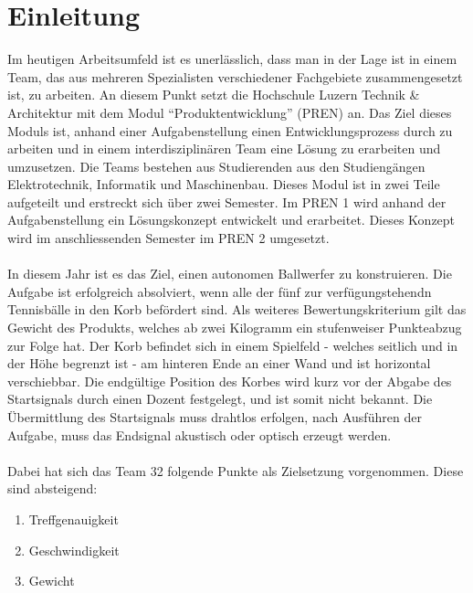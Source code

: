 ﻿\section{Einleitung}
Im heutigen Arbeitsumfeld ist es unerlässlich, dass man in der Lage ist in einem Team, das aus mehreren Spezialisten verschiedener Fachgebiete zusammengesetzt ist, zu arbeiten. An diesem Punkt setzt die Hochschule Luzern Technik \& Architektur mit dem Modul \enquote{Produktentwicklung} (PREN) an. Das Ziel dieses Moduls ist, anhand einer Aufgabenstellung einen Entwicklungsprozess durch zu arbeiten und in einem interdisziplinären Team eine Lösung zu erarbeiten und umzusetzen. Die Teams bestehen aus Studierenden aus den Studiengängen Elektrotechnik, Informatik und Maschinenbau. Dieses Modul ist in zwei Teile aufgeteilt und erstreckt sich über zwei Semester. Im PREN 1 wird anhand der Aufgabenstellung ein Lösungskonzept entwickelt und erarbeitet. Dieses Konzept wird im anschliessenden Semester im PREN 2 umgesetzt.\\
\\
In diesem Jahr ist es das Ziel, einen autonomen Ballwerfer zu konstruieren. Die Aufgabe ist erfolgreich absolviert, wenn alle der fünf zur verfügungstehendn Tennisbälle in den Korb befördert sind. Als weiteres Bewertungskriterium gilt das Gewicht des Produkts, welches ab zwei Kilogramm ein stufenweiser Punkteabzug zur Folge hat. Der Korb befindet sich in einem Spielfeld - welches seitlich und in der Höhe begrenzt ist - am hinteren Ende an einer Wand und ist horizontal verschiebbar. Die endgültige Position des Korbes wird kurz vor der Abgabe des Startsignals durch einen Dozent festgelegt, und ist somit nicht bekannt. Die Übermittlung des Startsignals muss drahtlos erfolgen, nach Ausführen der Aufgabe, muss das Endsignal akustisch oder optisch erzeugt werden.\\
\\
Dabei hat sich das Team 32 folgende Punkte als Zielsetzung vorgenommen. Diese sind absteigend:
\begin{enumerate}
    \item Treffgenauigkeit
    \item Geschwindigkeit
    \item Gewicht
\end{enumerate}
